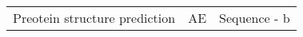 \begin{center}
\begin{tabular}{l c c}
    Preotein structure prediction & AE & Sequence - b
\end{tabular}
\end{center}